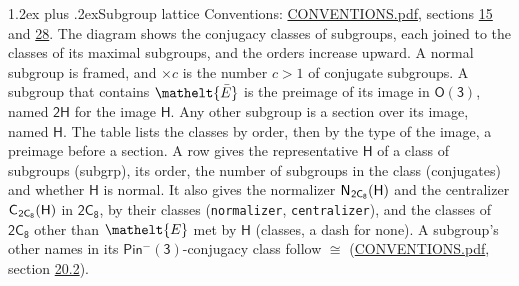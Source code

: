 \documentclass[10pt,a4paper]{article}
\makeatletter
\renewcommand\section{\@startsection{section}{1}{\z@}{-3ex plus -1ex minus -.2ex}%
  {1.2ex plus .2ex}{\normalfont\large\sffamily\bfseries\color{parttitle}}}
\numberwithin{equation}{section}
\newcommand{\eltfont}[1]{{\let\sigma\eltsigma\mathelt{#1}}}
\newcommand{\grp}[1]{\mathsf{#1}}
\newcommand{\cls}[1]{\eltfont{#1}}
\newcommand{\elt}[1]{\eltfont{#1}}
\newcommand{\samecls}{\cong}
\newcommand{\barred}[1]{\bar{#1}}
\newcommand{\hairsp}{\mkern1mu}
\makeatother
\begin{document}
\section{Subgroup lattice}\label{s:subgroups}
Conventions: \href{../../CONVENTIONS.pdf}{CONVENTIONS.pdf}, sections \href{../../../rotation/CONVENTIONS.pdf\#conv.15}{15} and \href{../../CONVENTIONS.pdf\#conv.28}{28}.
The diagram shows the conjugacy classes of subgroups, each joined to the classes of its maximal subgroups, and the orders increase upward. \label{n:index.conjugates.c}A normal subgroup is framed, and ${\times}c$ is the number $c > 1$ of conjugate subgroups. \label{n:group.H}A subgroup that contains $\elt{\barred{E}}$ is the preimage of its image in $\grp{O(3)}$, named $\grp{2H}$ for the image $\grp{H}$. Any other subgroup is a section over its image, named $\grp{H}$. The table lists the classes by order, then by the type of the image, a preimage before a section. \label{n:head.subgroup}\label{n:head.order}\label{n:head.conjugates}\label{n:head.normal}A row gives the representative $\grp{H}$ of a class of subgroups (subgrp), its order, the number of subgroups in the class (conjugates) and whether $\grp{H}$ is normal. \label{n:group.normalizer}\label{n:group.centralizer}\label{n:head.classes}It also gives the normalizer $\grp{N}_{\hairsp \grp{2C_{8}}}(\grp{H})$ and the centralizer $\grp{C}_{\hairsp \grp{2C_{8}}}(\grp{H})$ in $\grp{2C_{8}}$, by their classes (\texttt{normalizer}, \texttt{centralizer}), and the classes of $\grp{2C_{8}}$ other than $\cls{E}$ met by $\grp{H}$ (classes, a dash for none). A subgroup's other names in its \href{Pinminus3.pdf}{$\grp{Pin^{-}(3)}$}-conjugacy class follow $\samecls$ (\href{../../CONVENTIONS.pdf}{CONVENTIONS.pdf}, section \href{../../CONVENTIONS.pdf\#conv.20.2}{20.2}).
\begin{center}
\end{center}
\end{document}
